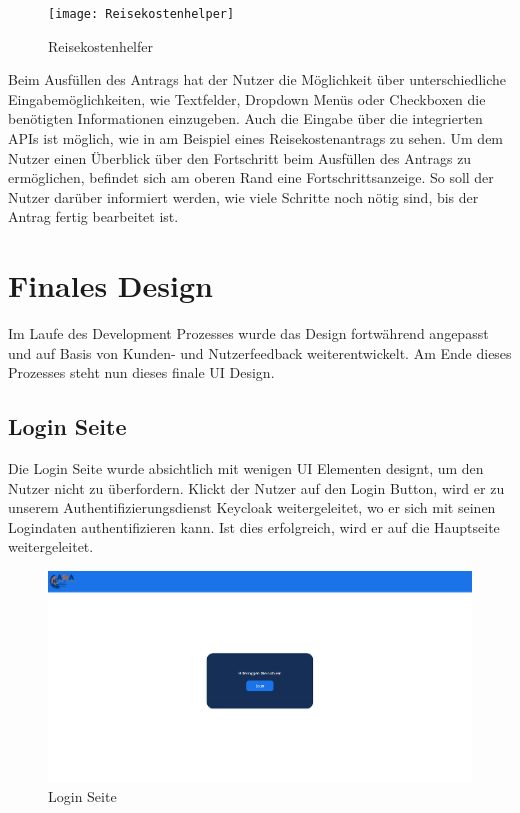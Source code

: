 \begin{figure}[h]
\centering
\texttt{[image: Reisekostenhelper]}
\caption{Reisekostenhelfer}\label{Reisekostenhelfer}
\end{figure}

Beim Ausfüllen des Antrags hat der Nutzer die Möglichkeit über unterschiedliche Eingabemöglichkeiten,
wie Textfelder, Dropdown Menüs oder Checkboxen die benötigten Informationen einzugeben. Auch die Eingabe
über die integrierten \ac{API}s ist möglich, wie in  am Beispiel eines Reisekostenantrags zu sehen.
Um dem Nutzer einen Überblick über den Fortschritt beim Ausfüllen des Antrags zu ermöglichen, befindet sich am oberen
Rand eine Fortschrittsanzeige.
So soll der Nutzer darüber informiert werden, wie viele Schritte noch
nötig sind, bis der Antrag fertig bearbeitet ist.

\section{Finales Design}\label{Finales Design}
Im Laufe des Development Prozesses wurde das Design fortwährend angepasst und auf Basis
von Kunden- und Nutzerfeedback weiterentwickelt. Am Ende dieses Prozesses steht nun
dieses finale \ac{UI} Design.

\subsection{Login Seite}\label{Login Seite}
Die Login Seite wurde absichtlich mit wenigen \ac{UI} Elementen designt, um den Nutzer
nicht zu überfordern. Klickt der Nutzer auf den Login Button, wird er zu unserem
Authentifizierungsdienst Keycloak weitergeleitet, wo er sich mit seinen Logindaten
authentifizieren kann. Ist dies erfolgreich, wird er auf die Hauptseite weitergeleitet.

\begin{figure}[h]
\centering
\includegraphics[width=1.0\textwidth]{Doc/images/Login Page.png}
\caption{Login Seite}\label{Login Page}
\end{figure}

